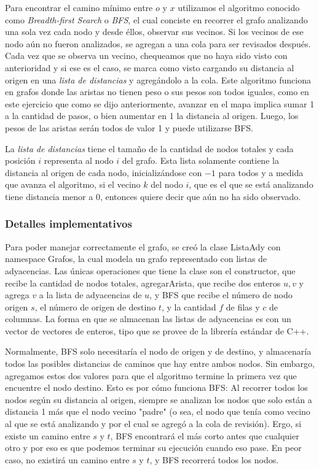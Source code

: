         Para encontrar el camino mínimo entre $o$ y $x$ utilizamos el algoritmo conocido como \textit{Breadth-first Search} o \textit{BFS}, el cual conciste en recorrer el grafo analizando una sola vez cada nodo y desde éllos, observar sus vecinos. Si los vecinos de ese nodo aún no fueron analizados, se agregan a una cola para ser revisados después. Cada vez que se observa un vecino, chequeamos que no haya sido visto con anterioridad y si ese es el caso, se marca como visto cargando su distancia al origen en una \textit{lista de distancias} y agregándolo a la cola. Este algoritmo funciona en grafos donde las aristas no tienen peso o sus pesos son todos iguales, como en este ejercicio que como se dijo anteriormente, avanzar en el mapa implica sumar 1 a la cantidad de pasos, o bien aumentar en 1 la distancia al origen. Luego, los pesos de las aristas serán todos de valor 1 y puede utilizarse BFS.

        La \textit{lista de distancias} tiene el tamaño de la cantidad de nodos totales y cada posición $i$ representa al nodo $i$ del grafo. Esta lista solamente contiene la distancia al origen de cada nodo, inicializándose con $-1$ para todos y a medida que avanza el algoritmo, si el vecino $k$ del nodo $i$, que es el que se está analizando tiene distancia menor a $0$, entonces quiere decir que aún no ha sido observado.


        \subsubsection{Detalles implementativos}
            Para poder manejar correctamente el grafo, se creó la clase ListaAdy con namespace Grafos, la cual modela un grafo representado con listas de adyacencias. Las únicas operaciones que tiene la clase son el constructor, que recibe la cantidad de nodos totales, agregarArista, que recibe dos enteros $u,v$ y agrega $v$ a la lista de adyacencias de $u$, y BFS que recibe el número de nodo origen $s$, el número de origen de destino $t$, y la cantidad $f$ de filas y $c$ de columnas.
            La forma en que se almacenan las listas de adyacencias es con un vector de vectores de enteros, tipo que se provee de la librería estándar de C++.

            Normalmente, BFS solo necesitaría el nodo de origen y de destino, y almacenaría todos las posibles distancias de caminos que hay entre ambos nodos. Sin embargo, agregamos estos dos valores para que el algoritmo termine la primera vez que encuentre el nodo destino. Esto es por cómo funciona BFS: Al recorrer todos los nodos según su distancia al origen, siempre se analizan los nodos que solo están a distancia 1 más que el nodo vecino "padre" (o sea, el nodo que tenía como vecino al que se está analizando y por el cual se agregó a la cola de revisión). Ergo, si existe un camino entre $s$ y $t$, BFS encontrará el más corto antes que cualquier otro y por eso es que podemos terminar su ejecución cuando eso pase. En peor caso, no existirá un camino entre $s$ y $t$, y BFS recorrerá todos los nodos.

